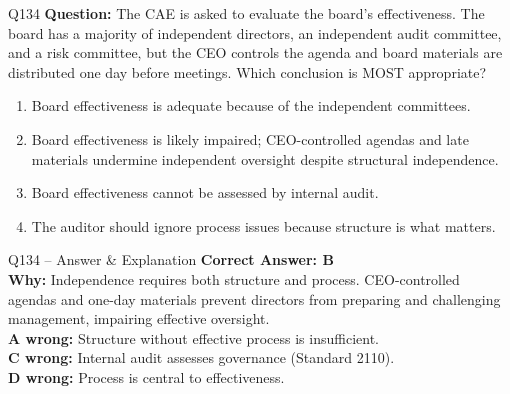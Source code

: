 \documentclass[aspectratio=169,10pt]{beamer}
\begin{document}
	\begin{frame}[t]{Q134}
		\small
		\textbf{Question:} The CAE is asked to evaluate the board's effectiveness. The board has a majority of independent directors, an independent audit committee, and a risk committee, but the CEO controls the agenda and board materials are distributed one day before meetings. Which conclusion is MOST appropriate?
		\begin{enumerate}[label=\Alph*.,itemsep=1pt,topsep=2pt]
			\item Board effectiveness is adequate because of the independent committees.
			\item Board effectiveness is likely impaired; CEO-controlled agendas and late materials undermine independent oversight despite structural independence.
			\item Board effectiveness cannot be assessed by internal audit.
			\item The auditor should ignore process issues because structure is what matters.
		\end{enumerate}
	\end{frame}
	
	\begin{frame}[t]{Q134 -- Answer \& Explanation}
		\small
		\textbf{Correct Answer: B} \\[4pt]
		\textbf{Why:} Independence requires both structure and process. CEO-controlled agendas and one-day materials prevent directors from preparing and challenging management, impairing effective oversight. \\[4pt]
		\textbf{A wrong:} Structure without effective process is insufficient. \\[2pt]
		\textbf{C wrong:} Internal audit assesses governance (Standard 2110). \\[2pt]
		\textbf{D wrong:} Process is central to effectiveness.
	\end{frame}
	
\end{document}
